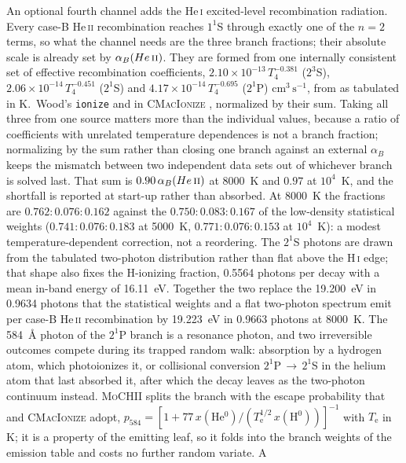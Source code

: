 \documentclass[twocolumn,linenumbers]{aastex702}
\newcommand{\code}[1]{\texttt{#1}}
\newcommand{\MoCHII}{\textsc{MoCHII}}
\newcommand{\HI}{H\,\textsc{i}}
\newcommand{\HeI}{He\,\textsc{i}}
\newcommand{\HeII}{He\,\textsc{ii}}
\newcommand{\Te}{T_{\mathrm{e}}}
\newcommand{\cmc}{\mathrm{cm^{3}\,s^{-1}}}
\begin{document}
An optional fourth channel adds the \HeI{} excited-level recombination
radiation.  Every case-B \HeII{} recombination reaches $1^1$S through
exactly one of the $n=2$ terms, so what the channel needs are the three
branch fractions; their absolute scale is already set by $\alpha_B(\HeII)$.
They are formed from one internally consistent set of effective
recombination coefficients,
$2.10\times10^{-13}\,T_4^{-0.381}$ ($2^3$S),
$2.06\times10^{-14}\,T_4^{-0.451}$ ($2^1$S) and
$4.17\times10^{-14}\,T_4^{-0.695}$ ($2^1$P) $\cmc$, from
\citet[][Table~1, with J.~S.~Mathis]{benjamin1999} as tabulated in K.~Wood's
\code{ionize} \citep{wood2004} and in \textsc{CMacIonize}
\citep{cmacionize2018}, normalized by their sum.  Taking all three from one
source matters more than the individual values, because a ratio of
coefficients with unrelated temperature dependences is not a branch fraction;
normalizing by the sum rather than closing one branch against an external
$\alpha_B$ keeps the mismatch between two independent data sets out of
whichever branch is solved last.  That sum is $0.90\,\alpha_B(\HeII)$ at
8000~K and $0.97$ at $10^4$~K, and the shortfall is reported at start-up
rather than absorbed.  At 8000~K the fractions are $0.762 : 0.076 : 0.162$
against the $0.750 : 0.083 : 0.167$ of the low-density statistical weights
($0.741 : 0.076 : 0.183$ at 5000~K, $0.771 : 0.076 : 0.153$ at $10^4$~K): a
modest temperature-dependent correction, not a reordering.  The $2^1$S
photons are drawn from the tabulated \citet{drake1969} two-photon
distribution rather than flat above the \HI{} edge; that shape also fixes the
H-ionizing fraction, 0.5564 photons per decay with a mean in-band energy of
16.11~eV.  Together the two replace the 19.200~eV in 0.9634 photons that the
statistical weights and a flat two-photon spectrum emit per case-B \HeII{}
recombination by 19.223~eV in 0.9663 photons at 8000~K.  The 584~\AA{}
photon of the $2^1$P branch is a resonance photon, and two irreversible
outcomes compete during its trapped random walk: absorption by a hydrogen
atom, which photoionizes it, or collisional conversion
$2^1$P\,$\to$\,$2^1$S in the helium atom that last absorbed it, after which
the decay leaves as the two-photon continuum instead.  \MoCHII{} splits the
branch with the escape probability that \citet{wood2004} and
\textsc{CMacIonize} \citep{cmacionize2018} adopt,
$p_{584} = [1 + 77\,x(\mathrm{He^{0}})/(\Te^{1/2}\,x(\mathrm{H^{0}}))]^{-1}$
with $\Te$ in K; it is a property of the emitting leaf, so it folds into the
branch weights of the emission table and costs no further random variate.  A
\end{document}
